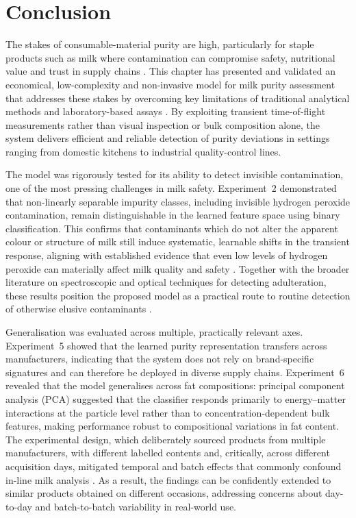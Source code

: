 \documentclass[12pt,a4paper,oneside]{report}
\let\oldsection\section
\renewcommand{\section}{\clearpage\oldsection}
\begin{document}
\section{Conclusion}
\label{sec:conclusion_chapter6}
\noindent
The stakes of consumable-material purity are high, particularly for staple products such as milk where contamination can compromise safety, nutritional value and trust in supply chains \cite{gregory1961,goodman1986}. This chapter has presented and validated an economical, low-complexity and non-invasive model for milk purity assessment that addresses these stakes by overcoming key limitations of traditional analytical methods and laboratory-based assays \cite{joolaei2025}. By exploiting transient time-of-flight measurements rather than visual inspection or bulk composition alone, the system delivers efficient and reliable detection of purity deviations in settings ranging from domestic kitchens to industrial quality-control lines.

The model was rigorously tested for its ability to detect invisible contamination, one of the most pressing challenges in milk safety. Experiment~2 demonstrated that non-linearly separable impurity classes, including invisible hydrogen peroxide contamination, remain distinguishable in the learned feature space using binary classification. This confirms that contaminants which do not alter the apparent colour or structure of milk still induce systematic, learnable shifts in the transient response, aligning with established evidence that even low levels of hydrogen peroxide can materially affect milk quality and safety \cite{gregory1961}. Together with the broader literature on spectroscopic and optical techniques for detecting adulteration, these results position the proposed model as a practical route to routine detection of otherwise elusive contaminants \cite{aernouts2015,joolaei2025}.

Generalisation was evaluated across multiple, practically relevant axes. Experiment~5 showed that the learned purity representation transfers across manufacturers, indicating that the system does not rely on brand-specific signatures and can therefore be deployed in diverse supply chains. Experiment~6 revealed that the model generalises across fat compositions: principal component analysis (PCA) suggested that the classifier responds primarily to energy--matter interactions at the particle level rather than to concentration-dependent bulk features, making performance robust to compositional variations in fat content. The experimental design, which deliberately sourced products from multiple manufacturers, with different labelled contents and, critically, across different acquisition days, mitigated temporal and batch effects that commonly confound in-line milk analysis \cite{melfsen2012,lott2023}. As a result, the findings can be confidently extended to similar products obtained on different occasions, addressing concerns about day-to-day and batch-to-batch variability in real-world use.
\end{document}
